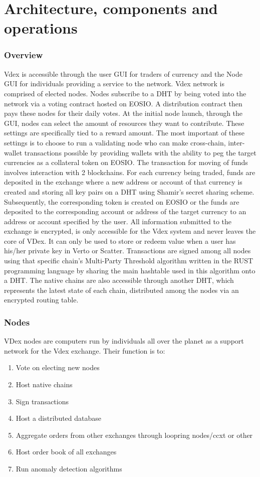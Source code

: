 \documentclass[]{article}
\begin{document}
{									
\section{Architecture, components and operations}
	
	\subsubsection{Overview}
	Vdex is accessible through the user GUI for traders of currency and the Node GUI for individuals providing a service to the network.     Vdex network is comprised of elected nodes.
	Nodes subscribe to a DHT 
	by being voted into the network via a voting contract hosted on EOSIO. 
	A distribution contract then pays these nodes for their daily votes.
	At the initial node launch, through the GUI, nodes can select the amount of resources they want to contribute.
	These settings are specifically tied to a reward amount.
	The most important of these settings is to choose to run a validating node who can make cross-chain, inter-wallet transactions possible by providing wallets with the ability to peg the target currencies as a collateral token on EOSIO. 
	The transaction for moving of funds involves interaction with 2 blockchains. 
	For each currency being traded, funds are deposited in the exchange where a new address or account of that currency is created and storing all key pairs on a DHT using Shamir's secret sharing scheme. Subsequently, the corresponding token is created on EOSIO or the funds are deposited to the corresponding account or address of the target currency to an address or account specified by the user.
	All information submitted to the exchange is encrypted, is only accessible for the Vdex system  and never leaves the core of VDex. It can only be used to store or redeem value when a user has his/her private key in Verto or Scatter.
	Transactions are signed among all nodes using that specific chain's Multi-Party Threshold algorithm  \cite{26}  written in the RUST  programming language by sharing the main hashtable used in this algorithm onto a DHT. 
	The native chains are also accessible through another DHT, which represents the latest state of each chain, distributed among the nodes via an encrypted routing table.\cite{27} \cite{28}
	 
\subsubsection{Nodes}
VDex nodes are computers run by individuals all over the planet as a support network for the Vdex exchange. 
Their function is to:\
\begin{enumerate}
	\item Vote on electing new nodes
	\item Host native chains
	\item Sign transactions
	\item Host a distributed database
	\item Aggregate orders from other exchanges through loopring nodes/ccxt or other 
	\item Host order book of all exchanges
	\item Run anomaly detection algorithms


\end{enumerate}}
\end{document}

